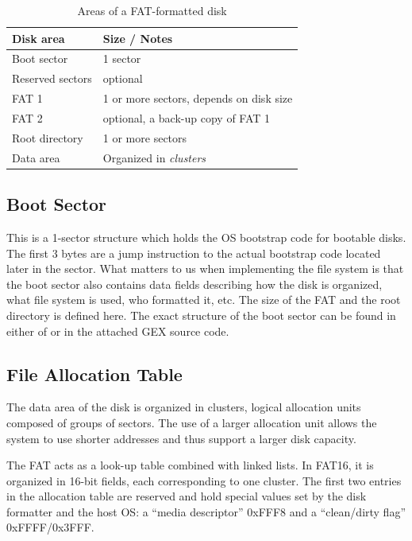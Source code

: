 \begin{table}[h]
	\centering
	\begin{tabular}{ll}
		\toprule
		\textbf{Disk area} & \textbf{Size / Notes} \\
		\midrule
		Boot sector & 1 sector \\
		Reserved sectors & optional \\
		FAT 1 & 1 or more sectors, depends on disk size \\
		FAT 2 & optional, a back-up copy of FAT 1 \\
		Root directory & 1 or more sectors \\
		Data area & Organized in \textit{clusters} \\
		\bottomrule
	\end{tabular}
	\caption{\label{tab:fat16-disk-areas}Areas of a FAT-formatted disk}
\end{table}

\subsection{Boot Sector}

This is a 1-sector structure which holds the \gls{OS} bootstrap code for bootable disks. The first 3 bytes are a jump instruction to the actual bootstrap code located later in the sector. What matters to us when implementing the file system is that the boot sector also contains data fields describing how the disk is organized, what file system is used, who formatted it, etc. The size of the \gls{FAT} and the root directory is defined here. The exact structure of the boot sector can be found in either of \cite{ms-fat,fat16-brainy,fat16-maverick,fat16-phobos,fat-whitepaper} or in the attached GEX source code.

\subsection{File Allocation Table}

The data area of the disk is organized in clusters, logical allocation units composed of groups of sectors. The use of a larger allocation unit allows the system to use shorter addresses and thus support a larger disk capacity.

The \gls{FAT} acts as a look-up table combined with linked lists. In FAT16, it is organized in 16-bit fields, each corresponding to one cluster. The first two entries in the allocation table are reserved and hold special values set by the disk formatter and the host \gls{OS}: a ``media descriptor'' 0xFFF8 and a ``clean/dirty flag'' 0xFFFF/0x3FFF.


